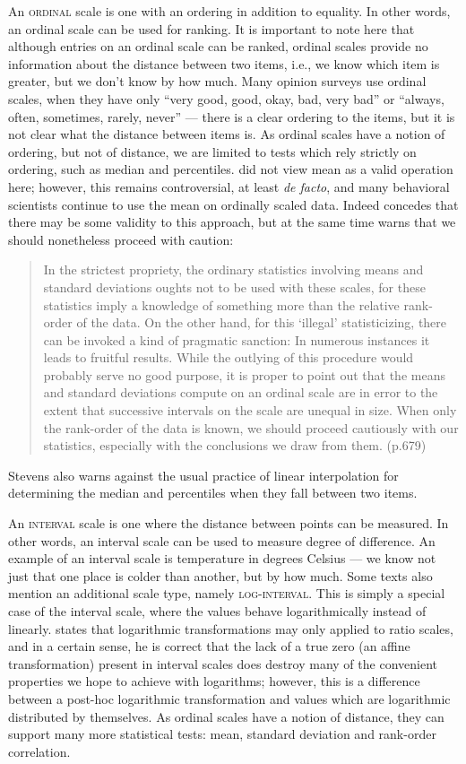 \documentclass[a4paper,12pt,oneside,leqno]{scrartcl}%
\newcommand{\terminus}[1]{\textsc{#1}}
\begin{document}
An \terminus{ordinal} scale is one with an ordering in addition to equality.  
In other words, an ordinal scale can be used for ranking.  
It is important to note here that although entries on an ordinal scale can be ranked, ordinal scales provide no information about the distance between two items, i.e., we know which item is greater, but we don't know by how much.
Many opinion surveys use ordinal scales, when they have only ``very good, good, okay, bad, very bad'' or ``always, often, sometimes, rarely, never'' --- there is a clear ordering to the items, but it is not clear what the distance between items is.  
As ordinal scales have a notion of ordering, but not of distance, we are limited to tests which rely strictly on ordering, such as median and percentiles. \citet{stevens1946a} did not view mean as a valid operation here; however, this remains controversial, at least \emph{de facto}, and many behavioral scientists continue to use the mean on ordinally scaled data.  
Indeed  \citeauthor{stevens1946a}  concedes that there may be some validity to this approach, but at the same time warns that we should nonetheless proceed with caution:
\begin{quote}
In the strictest propriety, the ordinary statistics involving means and standard deviations oughts not to be used with these scales, for these statistics imply a knowledge of something more than the relative rank-order of the data.  On the other hand, for this `illegal' statisticizing, there can be invoked a kind of pragmatic sanction: In numerous instances it leads to fruitful results.  While the outlying of this procedure would probably serve no good purpose, it is proper to point out that the means and standard deviations compute on an ordinal scale are in error to the extent that successive intervals on the scale are unequal in size.  When only the rank-order of the data is known, we should proceed cautiously with our statistics, especially with the conclusions we draw from them. (p.679)
\end{quote}
Stevens also warns against the usual practice of linear interpolation for determining the median and percentiles when they fall between two items.
  
An \terminus{interval} scale is one where the distance between points can be measured. 
In other words, an interval scale can be used to measure degree of difference.
An example of an interval scale is temperature in degrees Celsius --- we know not just that one place is colder than another, but by how much. 
Some texts also mention an additional scale type, namely \terminus{log-interval}.  
This is simply a special case of the interval scale, where the values behave logarithmically instead of linearly. 
\citet[p. 680]{stevens1946a} states that logarithmic transformations may only applied to ratio scales, and in a certain sense, he is correct that the lack of a true zero (an affine transformation) present in interval scales does destroy many of the convenient properties we hope to achieve with logarithms; however, this is a difference between a post-hoc logarithmic transformation and values which are logarithmic distributed by themselves. 
As ordinal scales have a notion of distance, they can support many more statistical tests: mean, standard deviation and rank-order correlation.  
\end{document}
